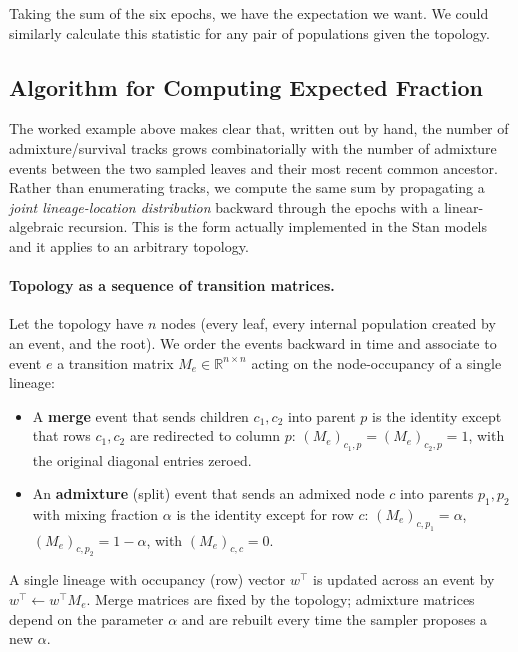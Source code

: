 \documentclass[12pt]{article}
\theoremstyle{definition}
\theoremstyle{definition}
\theoremstyle{lemma}
\theoremstyle{remark}
\theoremstyle{definition}
\begin{document}
Taking the sum of the six epochs, we have the expectation we want. We could similarly calculate this statistic for any pair of populations given the topology.
\subsection{Algorithm for Computing Expected Fraction}\label{sec:algorithm}
The worked example above makes clear that, written out by hand, the number of
admixture/survival tracks grows combinatorially with the number of admixture
events between the two sampled leaves and their most recent common ancestor.
Rather than enumerating tracks, we compute the same sum by propagating a
\emph{joint lineage-location distribution} backward through the epochs with a
linear-algebraic recursion. This is the form actually implemented in the Stan
models and it applies to an arbitrary topology.

\paragraph{Topology as a sequence of transition matrices.}
Let the topology have $n$ nodes (every leaf, every internal population created
by an event, and the root). We order the events backward in time and associate
to event $e$ a transition matrix $M_e\in\mathbb{R}^{n\times n}$ acting on the
node-occupancy of a single lineage:
\begin{itemize}
  \item A \textbf{merge} event that sends children $c_1,c_2$ into parent $p$ is
  the identity except that rows $c_1,c_2$ are redirected to column $p$:
  $(M_e)_{c_1,p}=(M_e)_{c_2,p}=1$, with the original diagonal entries zeroed.
  \item An \textbf{admixture} (split) event that sends an admixed node $c$ into
  parents $p_1,p_2$ with mixing fraction $\alpha$ is the identity except for
  row $c$: $(M_e)_{c,p_1}=\alpha$, $(M_e)_{c,p_2}=1-\alpha$, with $(M_e)_{c,c}=0$.
\end{itemize}
A single lineage with occupancy (row) vector $w^\top$ is updated across an event
by $w^\top \leftarrow w^\top M_e$. Merge matrices are fixed by the topology;
admixture matrices depend on the parameter $\alpha$ and are rebuilt every time
the sampler proposes a new $\alpha$.
\end{document}
